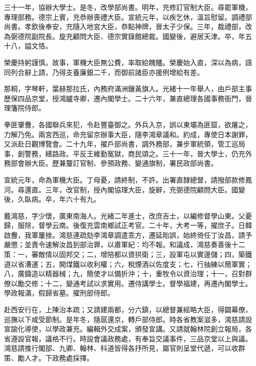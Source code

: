 \begin{pinyinscope}
三十一年，協辦大學士。是冬，改學部尚書。明年，充修訂官制大臣。尋罷軍機，專理部務。德宗上賓，充恭辦喪禮大臣。宣統元年，以疾乞休，溫旨慰留。調禮部尚書。孝欽後奉安，充隨入地宮大臣，恭點神牌，晉太子少保。三年，裁禮部，改為弼德院副院長。旋充顧問大臣、德宗實錄館總裁。國變後，避居天津。卒，年五十八，謚文恪。

榮慶持躬謹慎。故事，軍機大臣無公費，率取給餽贐。榮慶始入直，深以為病，語同列合辭上請，乃得支養廉銀二千，而御前諸臣亦援例增給有差。

那桐，字琴軒，葉赫那拉氏，內務府滿洲鑲黃旗人。光緒十一年舉人，由戶部主事歷保四品京堂，授鴻臚寺卿，遷內閣學士。二十六年，兼直總理各國事務衙門，晉理籓院侍郎。

拳匪肇釁，各國聯兵來犯，令赴豐臺御之。外兵入京，誤以東壩為匪窟，欲屠之，力解乃免。兩宮西巡，命充留京辦事大臣，隨李鴻章議和。約成，專使日本謝罪，又派赴日觀博覽會。二十九年，擢戶部尚書，調外務部，兼步軍統領，管工巡局事，創警務，繕路政。平反王維勤冤獄，商民頌之。三十一年，晉大學士，仍充外務部會辦大臣。歷兼釐訂官制、參預政務、變通旗制，署民政部尚書。

宣統元年，命為軍機大臣。丁母憂，請終制，不許。出署直隸總督，請撥部款修鳳河。尋還直。三年，改官制，授內閣協理大臣，旋辭，充弼德院顧問大臣。國變後，久臥病。卒，年六十有九。

戴鴻慈，字少懷，廣東南海人。光緒二年進士，改庶吉士，以編修督學山東。父憂歸，服除，督學云南。後復充雲南鄉試正考官。二十年，大考一等，擢庶子。日韓啟釁，我軍屢挫。鴻慈連疏劾李鴻章調遣乖方，遷延貽誤，始終倚任丁汝昌，請予嚴懲；並責令速解汝昌到部治罪，以肅軍紀：均不報。和議成，鴻慈奏善後十二策：一，審敵情以固邦交；二，增陪都以資拱衛；三，設軍屯以實邊儲；四，築鐵道以省漕運；五，開煤鐵以收利權；六，稅煙酒以佐度支；七，行抽練以簡軍實；八，廣鑄造以精器械；九，簡使才以備折沖；十，重牧令以資治理；十一，召對群僚以勵交修；十二，變通考試以求實用。遷侍講學士。督學福建，再遷內閣學士。學政報滿，假歸省墓。擢刑部侍郎。

赴西安行在，上陳治本疏；又請建兩都，分六鎮，以總督兼經略大臣，得闢幕僚，巡撫以下咸受節制。是年冬，隨扈還京，轉戶部侍郎。時各省教案滋多，鴻慈請設宣諭化導使，以學政兼充。編輯外交成案，頒發宣講。又請就翰林院創立報局，各省遵設官報，議格不行。時設會議政務處，有奉旨交議事件，三品京堂以上與議。鴻慈請推行閣部、九卿、翰林、科道皆得各抒所見，屬官則呈堂代遞，可以收群策、勵人才。下政務處採擇。


\end{pinyinscope}
